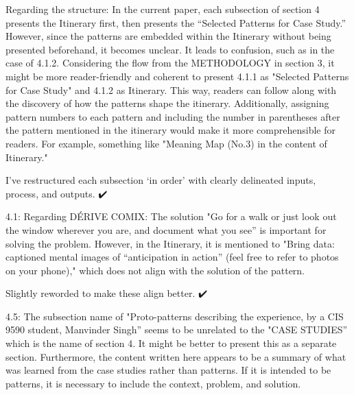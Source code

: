 \documentclass[acmlarge,timestamp]{acmart}
\begin{document}
\begin{leftbubbles}
Regarding the structure: In the current paper, each subsection of
section 4 presents the Itinerary first, then presents the “Selected
Patterns for Case Study.” However, since the patterns are embedded
within the Itinerary without being presented beforehand, it becomes
unclear. It leads to confusion, such as in the case of
4.1.2. Considering the flow from the METHODOLOGY in section 3, it
might be more reader-friendly and coherent to present 4.1.1 as
"Selected Patterns for Case Study" and 4.1.2 as Itinerary. This way,
readers can follow along with the discovery of how the patterns shape
the itinerary. Additionally, assigning pattern numbers to each pattern
and including the number in parentheses after the pattern mentioned in
the itinerary would make it more comprehensible for readers. For
example, something like "Meaning Map (No.3) in the content of
Itinerary."
\end{leftbubbles}

\begin{rightbubbles}
I’ve restructured each subsection ‘in order’ with clearly delineated
inputs, process, and outputs.  {\huge ✔️}
\end{rightbubbles}

\begin{leftbubbles}
4.1: Regarding DÉRIVE COMIX: The solution "Go for a walk or just look
out the window wherever you are, and document what you see” is
important for solving the problem. However, in the Itinerary, it is
mentioned to "Bring data: captioned mental images of “anticipation in
action” (feel free to refer to photos on your phone)," which does not
align with the solution of the pattern.
\end{leftbubbles}

\begin{rightbubbles}
Slightly reworded to make these align better. {\huge ✔️}
\end{rightbubbles}

\begin{leftbubbles}
4.5: The subsection name of "Proto-patterns describing the experience,
by a CIS 9590 student, Manvinder Singh” seems to be unrelated to the
"CASE STUDIES” which is the name of section 4. It might be better to
present this as a separate section. Furthermore, the content written
here appears to be a summary of what was learned from the case studies
rather than patterns. If it is intended to be patterns, it is
necessary to include the context, problem, and solution.
\end{leftbubbles}
\end{document}
